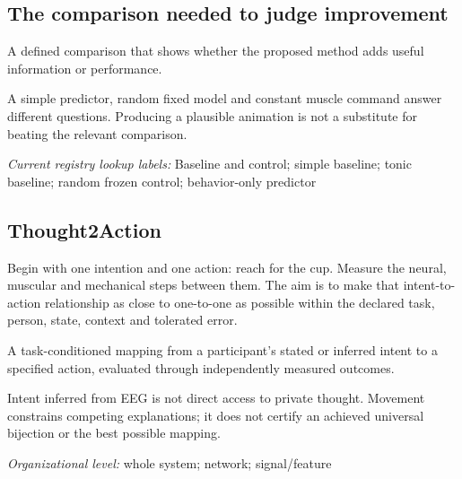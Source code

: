 \begin{samepage}
\subsection*{The comparison needed to judge improvement}
\noindent A defined comparison that shows whether the proposed method adds useful information or performance.\par
\end{samepage}
\begin{samepage}
\noindent A simple predictor, random fixed model and constant muscle command answer different questions. Producing a plausible animation is not a substitute for beating the relevant comparison.\par\nopagebreak[4]

\end{samepage}


\noindent\textit{Current registry lookup labels:} Baseline and control; simple baseline; tonic baseline; random frozen control; behavior-only predictor\par

\begin{samepage}
\subsection*{Thought2Action}
\noindent Begin with one intention and one action: reach for the cup. Measure the neural, muscular and mechanical steps between them. The aim is to make that intent-to-action relationship as close to one-to-one as possible within the declared task, person, state, context and tolerated error.\par
\end{samepage}
\noindent A task-conditioned mapping from a participant's stated or inferred intent to a specified action, evaluated through independently measured outcomes.\par
\noindent Intent inferred from EEG is not direct access to private thought. Movement constrains competing explanations; it does not certify an achieved universal bijection or the best possible mapping.\par
\begin{samepage}
\noindent\textit{Organizational level:} whole system; network; signal/feature\par\nopagebreak[4]

\end{samepage}


